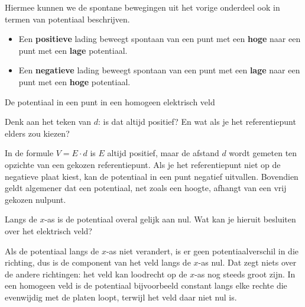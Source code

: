 \documentclass{ximera}
\begin{document}
Hiermee kunnen we de spontane bewegingen uit het vorige onderdeel ook in termen van potentiaal beschrijven.

\begin{proposition}[foldable=true,title={Spontane beweging en potentiaal}]\nl
\begin{itemize}
    \item Een \textbf{positieve} lading beweegt spontaan van een punt met een \textbf{hoge} naar een punt met een \textbf{lage} potentiaal.
    \item Een \textbf{negatieve} lading beweegt spontaan van een punt met een \textbf{lage} naar een punt met een \textbf{hoge} potentiaal.
\end{itemize}
\end{proposition}

\begin{question}
    De potentiaal in een punt in een homogeen elektrisch veld
    \begin{multipleChoice}
    \end{multipleChoice}
    \begin{hint}
        Denk aan het teken van $d$: is dat altijd positief? En wat als je het referentiepunt elders zou kiezen?
    \end{hint}
    \begin{solution}\nl
        In de formule $V = E \cdot d$ is $E$ altijd positief, maar de afstand $d$ wordt gemeten ten opzichte van een gekozen referentiepunt. Als je het referentiepunt niet op de negatieve plaat kiest, kan de potentiaal in een punt negatief uitvallen. Bovendien geldt algemener dat een potentiaal, net zoals een hoogte, afhangt van een vrij gekozen nulpunt.
    \end{solution}
\end{question}

\begin{question}
    Langs de $x$-as is de potentiaal overal gelijk aan nul. Wat kan je hieruit besluiten over het elektrisch veld?

    \begin{multipleChoice}
    \end{multipleChoice}

    \begin{solution}\nl
        Als de potentiaal langs de $x$-as niet verandert, is er geen potentiaalverschil in die richting, dus is de component van het veld langs de $x$-as nul. Dat zegt niets over de andere richtingen: het veld kan loodrecht op de $x$-as nog steeds groot zijn. In een homogeen veld is de potentiaal bijvoorbeeld constant langs elke rechte die evenwijdig met de platen loopt, terwijl het veld daar niet nul is.
    \end{solution}
\end{question}
\end{document}
